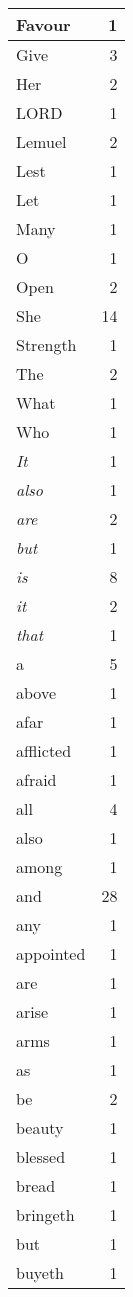 \begin{center}
\begin{longtable}{l|r}
Favour & 1\\ \hline 
Give & 3\\ \hline 
Her & 2\\ \hline 
LORD & 1\\ \hline 
Lemuel & 2\\ \hline 
Lest & 1\\ \hline 
Let & 1\\ \hline 
Many & 1\\ \hline 
O & 1\\ \hline 
Open & 2\\ \hline 
She & 14\\ \hline 
Strength & 1\\ \hline 
The & 2\\ \hline 
What & 1\\ \hline 
Who & 1\\ \hline 
\emph{It} & 1\\ \hline 
\emph{also} & 1\\ \hline 
\emph{are} & 2\\ \hline 
\emph{but} & 1\\ \hline 
\emph{is} & 8\\ \hline 
\emph{it} & 2\\ \hline 
\emph{that} & 1\\ \hline 
a & 5\\ \hline 
above & 1\\ \hline 
afar & 1\\ \hline 
afflicted & 1\\ \hline 
afraid & 1\\ \hline 
all & 4\\ \hline 
also & 1\\ \hline 
among & 1\\ \hline 
and & 28\\ \hline 
any & 1\\ \hline 
appointed & 1\\ \hline 
are & 1\\ \hline 
arise & 1\\ \hline 
arms & 1\\ \hline 
as & 1\\ \hline 
be & 2\\ \hline 
beauty & 1\\ \hline 
blessed & 1\\ \hline 
bread & 1\\ \hline 
bringeth & 1\\ \hline 
but & 1\\ \hline 
buyeth & 1\\ \hline 

\end{longtable}
\end{center}
